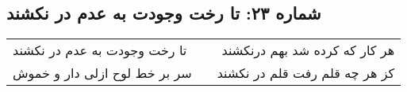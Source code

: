 \begin{center}
\section*{شماره ۲۳: تا رخت وجودت به عدم در نکشند}
\label{sec:023}
\begin{longtable}{l p{0.5cm} r}
تا رخت وجودت به عدم در نکشند
&&
هر کار که کرده شد بهم درنکشند
\\
سر بر خط لوح ازلی دار و خموش
&&
کز هر چه قلم رفت قلم در نکشند
\\
\end{longtable}
\end{center}
